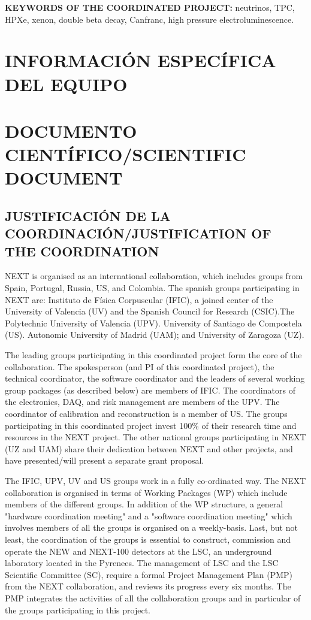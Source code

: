 \documentclass[a4paper,11pt,oneside]{article}
\begin{document}
 \vspace{0.3cm}

{\bf KEYWORDS OF THE COORDINATED PROJECT:} neutrinos, TPC, HPXe, xenon, double beta decay, Canfranc, high pressure electroluminescence. 

\section{INFORMACIÓN ESPECÍFICA DEL EQUIPO}

\section{\bf DOCUMENTO CIENTÍFICO/SCIENTIFIC DOCUMENT}

\subsection{\sc JUSTIFICACIÓN DE LA COORDINACIÓN/JUSTIFICATION OF THE COORDINATION}

NEXT is organised as an international collaboration, which includes groups from Spain, Portugal, Russia, US, and Colombia. The spanish groups participating in NEXT are: Instituto de Física Corpuscular (IFIC), a joined center of the University of Valencia (UV) and the Spanish Council for Research (CSIC).The  Polytechnic University of Valencia (UPV). University of Santiago de Compostela (US). Autonomic University of Madrid (UAM); and University of Zaragoza (UZ). 

The leading groups participating in this coordinated project form the core of the collaboration. The spokesperson (and PI of this coordinated project), the technical coordinator, the software coordinator and the leaders of several working group packages (as described below) are members of IFIC. The coordinators of the electronics, DAQ, and risk management are members of the UPV. The coordinator of calibration and reconstruction is a member of US. The groups participating in this coordinated project invest 100\% of their research time and resources in the NEXT project. The other national groups participating in NEXT (UZ and UAM) share their dedication between NEXT and other projects, and have presented/will present a separate grant proposal.

The IFIC, UPV, UV and US groups work in a fully co-ordinated way. The NEXT collaboration is organised in terms of Working Packages (WP) which include members of the different groups. In addition of the WP structure, a general "hardware coordination meeting" and a "software coordination meeting" which involves members of all the groups is organised on a weekly-basis. Last, but not least, the coordination of the groups is essential to construct, commission and operate the NEW and NEXT-100 detectors at the LSC, an underground laboratory located in the Pyrenees. The management of LSC and the LSC Scientific Committee (SC), require a formal Project Management Plan (PMP) from the NEXT collaboration, and reviews its progress every six months. The PMP integrates the activities of all the collaboration groups and in particular of the groups participating in this project. 
\end{document}
